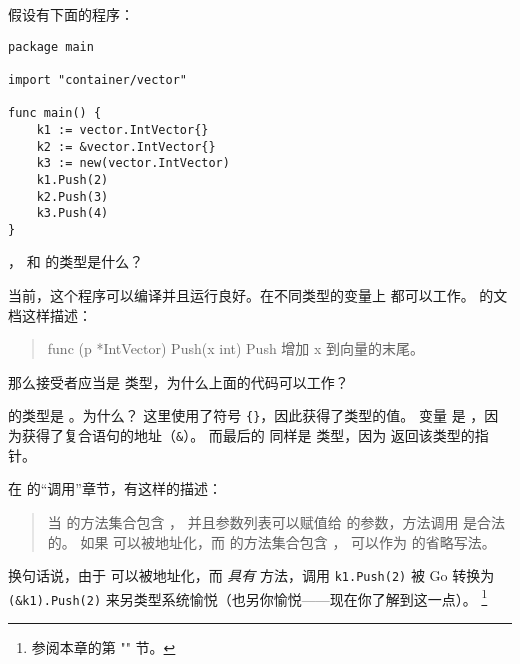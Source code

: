 \begin{Exercise}[title={方法调用},difficulty=8]
\label{ex:methodcalls}
\Question \label{ex:methodcalls q1} 假设有下面的程序：
\begin{lstlisting}
package main

import "container/vector"

func main() {
	k1 := vector.IntVector{}
	k2 := &vector.IntVector{}
	k3 := new(vector.IntVector)
	k1.Push(2)
	k2.Push(3)
	k3.Push(4)
}
\end{lstlisting}
， 和  的类型是什么？

\Question 当前，这个程序可以编译并且运行良好。在不同类型的变量上 
都可以工作。 的文档这样描述：
\begin{quote}
func (p *IntVector) Push(x int)
Push 增加 x 到向量的末尾。
\end{quote}
那么接受者应当是  类型，为什么上面的代码可以工作？

\end{Exercise}

\begin{Answer}
\Question {} 的类型是 。为什么？
这里使用了符号 \verb|{}|，因此获得了类型的值。
变量  是 ，因为获得了复合语句的地址（\verb|&|）。
而最后的  同样是  类型，因为 
返回该类型的指针。

\Question 在 \cite{go_spec} 的“调用”章节，有这样的描述：
\begin{quote}
当  的方法集合包含 ，
并且参数列表可以赋值给  的参数，方法调用  是合法的。
如果  可以被地址化，而  的方法集合包含 ，
 可以作为  的省略写法。
\end{quote}
换句话说，由于  可以被地址化，而 
\emph{具有}  方法，调用 \lstinline{k1.Push(2)} 被 Go 转换为 
\lstinline{(&k1).Push(2)} 来另类型系统愉悦（也另你愉悦——现在你了解到这一点）。
\footnote{参阅本章的第 "" 节。}

\end{Answer}
